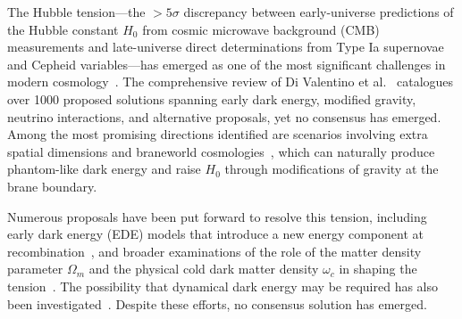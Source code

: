 \documentclass[12pt]{article}
\begin{document}
The Hubble tension---the $>5\sigma$ discrepancy between early-universe predictions of the Hubble constant $H_0$ from cosmic microwave background (CMB) measurements and late-universe direct determinations from Type Ia supernovae and Cepheid variables---has emerged as one of the most significant challenges in modern cosmology~\cite{divalentino2021, kamionkowski2023, hu2023}. The comprehensive review of Di Valentino et al.~\cite{divalentino2021} catalogues over 1000 proposed solutions spanning early dark energy, modified gravity, neutrino interactions, and alternative proposals, yet no consensus has emerged. Among the most promising directions identified are scenarios involving extra spatial dimensions and braneworld cosmologies~\cite{divalentino2021}, which can naturally produce phantom-like dark energy and raise $H_0$ through modifications of gravity at the brane boundary.

Numerous proposals have been put forward to resolve this tension, including early dark energy (EDE) models that introduce a new energy component at recombination~\cite{poulin2019}, and broader examinations of the role of the matter density parameter $\Omega_m$ and the physical cold dark matter density $\omega_c$ in shaping the tension~\cite{pedrotti2024}. The possibility that dynamical dark energy may be required has also been investigated~\cite{pang2025}. Despite these efforts, no consensus solution has emerged.
\end{document}
